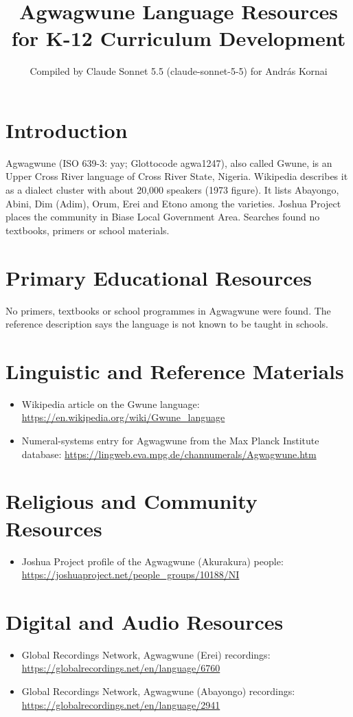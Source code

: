 \documentclass[12pt]{article}
\title{Agwagwune Language Resources for K-12 Curriculum Development}
\author{Compiled by Claude Sonnet 5.5 (claude-sonnet-5-5) for Andr\'as Kornai}
\date{}
\begin{document}
\maketitle

\section{Introduction}
Agwagwune (ISO 639-3: yay; Glottocode agwa1247), also called Gwune, is an Upper Cross River language of Cross River State, Nigeria. Wikipedia describes it as a dialect cluster with about 20,000 speakers (1973 figure). It lists Abayongo, Abini, Dim (Adim), Orum, Erei and Etono among the varieties. Joshua Project places the community in Biase Local Government Area. Searches found no textbooks, primers or school materials.

\section{Primary Educational Resources}
No primers, textbooks or school programmes in Agwagwune were found. The reference description says the language is not known to be taught in schools.

\section{Linguistic and Reference Materials}
\begin{itemize}
\item Wikipedia article on the Gwune language: \url{https://en.wikipedia.org/wiki/Gwune_language}
\item Numeral-systems entry for Agwagwune from the Max Planck Institute database: \url{https://lingweb.eva.mpg.de/channumerals/Agwagwune.htm}
\end{itemize}

\section{Religious and Community Resources}
\begin{itemize}
\item Joshua Project profile of the Agwagwune (Akurakura) people: \url{https://joshuaproject.net/people_groups/10188/NI}
\end{itemize}

\section{Digital and Audio Resources}
\begin{itemize}
\item Global Recordings Network, Agwagwune (Erei) recordings: \url{https://globalrecordings.net/en/language/6760}
\item Global Recordings Network, Agwagwune (Abayongo) recordings: \url{https://globalrecordings.net/en/language/2941}
\end{itemize}
\end{document}
